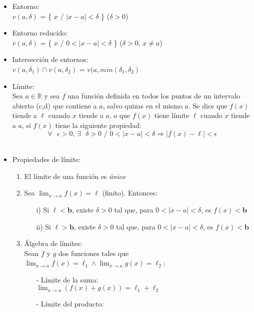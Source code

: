 \documentclass[a4paper,11pt]{report}
\begin{document}
\begin{itemize}
\item Entorno: \\
$v(a,\delta)$ = \{ $x$ / $|x-a|< \delta$ \} ($\delta > 0$)
\item Entorno reducido: \\
$\overline{v}(a,\delta)$ =  \{ $x$ / $0<|x-a|< \delta$ \} ($\delta > 0\text{, }x \neq a$) \\
\item Intersección de entornos: \\
$v(a,\delta_1) \cap v(a,\delta_2)$ = $v(a,min(\delta_1,\delta_2)$
\item Límite: \\
Sea $a \in \mathbb{R}$ y sea $f$ una función definida en todos los puntos de un intervalo abierto (c,d) que contiene a $a$, salvo quizas en el mismo $a$.
Se dice que $f(x)$ tiende a $\ell$ cuando $x$ tiende a $a$, o que $f(x)$ tiene límite $\ell$ cuando $x$ tiende a $a$, si $f(x)$ tiene la siguiente propiedad: \\
$$ \forall\text{ }\epsilon>0\text{, } \exists\text{ }\delta>0\text{ / }0<|x-a|<\delta \Longrightarrow |f(x) - \ell| < \epsilon$$ \\
\item Propiedades de límite: \\
\begin{enumerate}
\item El límite de una función es \emph{único} \\
\item Sea $\displaystyle \lim_{x\to a} f(x) = \ell$ (finito). Entonces:
\begin{itemize}
\item[i)] Si $\ell < \mathbf{b}$, existe $\delta > 0$ tal que, para $0 < |x-a| < \delta$, es $f(x) < \mathbf{b}$
\item[ii)] Si $\ell > \mathbf{b}$, existe $\delta > 0$ tal que, para $0 < |x-a| < \delta$, es $f(x) < \mathbf{b}$
\end{itemize}
\item Álgebra de límites: \\
Sean $f$ y $g$ dos funciones tales que $\displaystyle \lim_{x\to a} f(x) = \ell_1 \wedge \lim_{x\to a} g(x) = \ell_2$:
\begin{itemize}
\item[-] Límite de la suma: \\[5pt]
$\displaystyle \lim_{x\to a} (f(x)+g(x)) = \ell_1 + \ell_2$ \\[5pt]
\item[-] Límite del producto: \\[5pt]

\end{itemize}
\end{enumerate}
\end{itemize}
\end{document}
